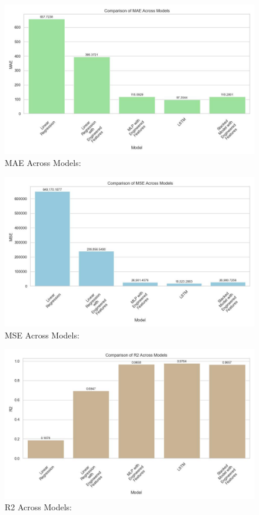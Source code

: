 \documentclass[mstat,12pt]{unswthesis}
\begin{document}
\begin{figure}
\centering
\includegraphics{img/mae_comparison_across_models.jpg}
\caption{MAE Across Models:}
\end{figure}

\begin{figure}
\centering
\includegraphics{img/mse_comparison_across_models.jpg}
\caption{MSE Across Models:}
\end{figure}

\begin{figure}
\centering
\includegraphics{img/r2_comparison_across_models.jpg}
\caption{R2 Across Models:}
\end{figure}
\end{document}
